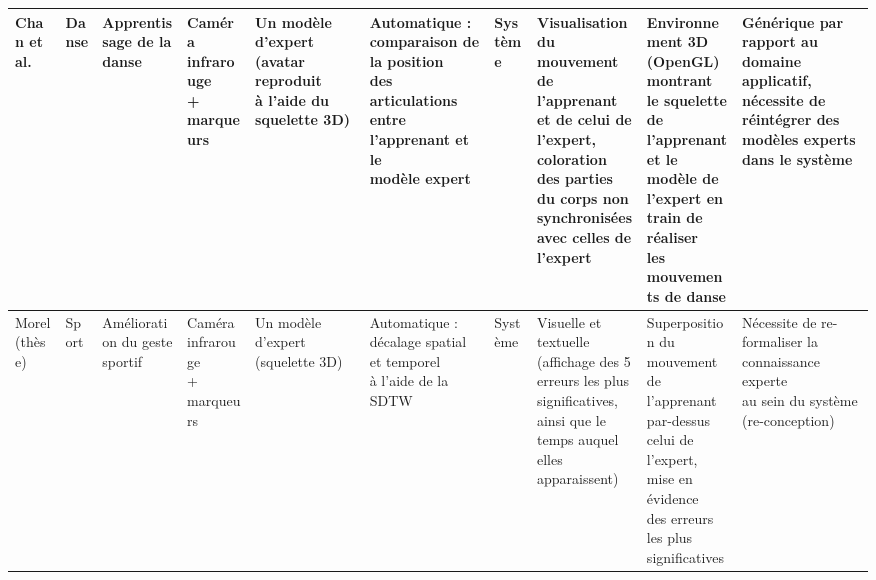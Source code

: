 \begin{landscape}
\begin{table}[]
{\begin{tabular}{|l|l|l|l|l|l|l|l|l|l|}
Chan et al. & Danse & Apprentissage de la danse & \makecell[l]{Caméra infrarouge\\+ marqueurs} & \makecell[l]{Un modèle d'expert (avatar reproduit\\à l'aide du squelette 3D)} & \makecell[l]{Automatique : comparaison de la position\\ des articulations entre l'apprenant et le\\modèle expert} & Système & \makecell[l]{Visualisation du mouvement de\\ l'apprenant et de celui de l'expert,\\coloration des parties du corps non\\synchronisées avec celles de l'expert} & \makecell[l]{Environnement 3D (OpenGL)\\montrant le squelette de\\l'apprenant et le modèle de\\l'expert en train de réaliser\\ les mouvements de danse} & \makecell[l]{Générique par rapport au domaine applicatif,\\nécessite de réintégrer des modèles experts\\dans le système} \\ \hline

Morel (thèse) & Sport & Amélioration du geste sportif & \makecell[l]{Caméra infrarouge\\+ marqueurs} & Un modèle d'expert (squelette 3D) & \makecell[l]{Automatique : décalage spatial et temporel\\à l'aide de la SDTW} & Système & \makecell[l]{Visuelle et textuelle (affichage des 5\\erreurs les plus significatives,\\ainsi que le temps auquel elles\\apparaissent)} & \makecell[l]{Superposition du mouvement\\de l'apprenant par-dessus\\celui de l'expert, mise en évidence\\des erreurs les plus\\ significatives} & \makecell[l]{Nécessite de re-formaliser la connaissance experte\\au sein du système (re-conception)} \\ \hline


\end{tabular}}
\end{table}
\end{landscape}
